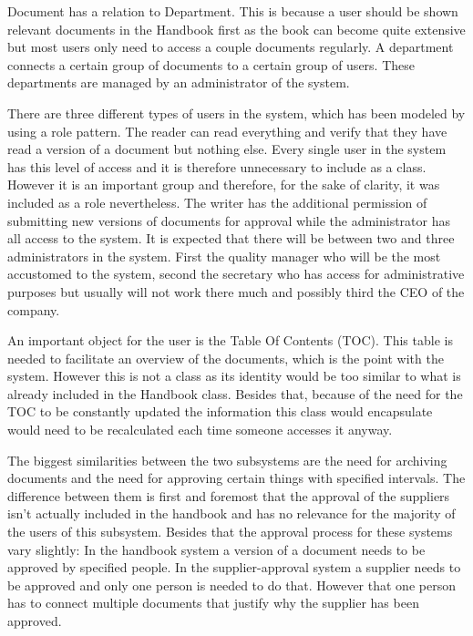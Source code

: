 Document has a relation to Department. This is because a user should be shown relevant documents in the Handbook first as the book can become quite extensive but most users only need to access a couple documents regularly. A department connects a certain group of documents to a certain group of users. These departments are managed by an administrator of the system.

There are three different types of users in the system, which has been modeled by using a role pattern. The reader can read everything and verify that they have read a version of a document but nothing else. Every single user in the system has this level of access and it is therefore unnecessary to include as a class. However it is an important group and therefore, for the sake of clarity, it was included as a role nevertheless. The writer has the additional permission of submitting new versions of documents for approval while the administrator has all access to the system. It is expected that there will be between two and three administrators in the system. First the quality manager who will be the most accustomed to the system, second the secretary who has access for administrative purposes but usually will not work there much and possibly third the CEO of the company.

An important object for the user is the Table Of Contents (TOC). This table is needed to facilitate an overview of the documents, which is the point with the system. However this is not a class as its identity would be too similar to what is already included in the Handbook class. Besides that, because of the need for the TOC to be constantly updated the information this class would encapsulate would need to be recalculated each time someone accesses it anyway.

The biggest similarities between the two subsystems are the need for archiving documents and the need for approving certain things with specified intervals.
The difference between them is first and foremost that the approval of the suppliers isn't actually included in the handbook and has no relevance for the majority of the users of this subsystem. Besides that the approval process for these systems vary slightly:
In the handbook system a version of a document needs to be approved by specified people.
In the supplier-approval system a supplier needs to be approved and only one person is needed to do that.
However that one person has to connect multiple documents that justify why the supplier has been approved.


